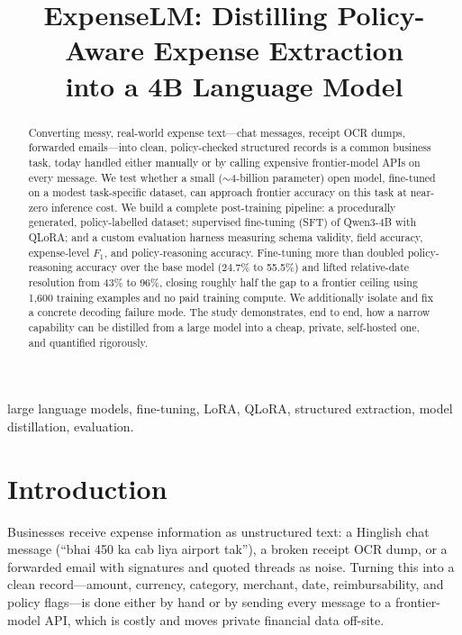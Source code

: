 \documentclass[conference]{IEEEtran}
\begin{document}
\title{ExpenseLM: Distilling Policy-Aware Expense Extraction\\into a 4B Language Model}

\author{
}

\maketitle

\begin{abstract}
Converting messy, real-world expense text---chat messages, receipt OCR dumps,
forwarded emails---into clean, policy-checked structured records is a common
business task, today handled either manually or by calling expensive
frontier-model APIs on every message. We test whether a small ($\sim$4-billion
parameter) open model, fine-tuned on a modest task-specific dataset, can
approach frontier accuracy on this task at near-zero inference cost. We build
a complete post-training pipeline: a procedurally generated, policy-labelled
dataset; supervised fine-tuning (SFT) of Qwen3-4B with QLoRA; and a custom
evaluation harness measuring schema validity, field accuracy, expense-level
$F_1$, and policy-reasoning accuracy. Fine-tuning more than doubled
policy-reasoning accuracy over the base model (24.7\% to 55.5\%) and lifted
relative-date resolution from 43\% to 96\%, closing roughly half the gap to a
frontier ceiling using 1{,}600 training examples and no paid training compute.
We additionally isolate and fix a concrete decoding failure mode. The study
demonstrates, end to end, how a narrow capability can be distilled from a large
model into a cheap, private, self-hosted one, and quantified rigorously.
\end{abstract}

\begin{IEEEkeywords}
large language models, fine-tuning, LoRA, QLoRA, structured extraction,
model distillation, evaluation.
\end{IEEEkeywords}

\section{Introduction}
Businesses receive expense information as unstructured text: a Hinglish chat
message (``bhai 450 ka cab liya airport tak''), a broken receipt OCR dump, or a
forwarded email with signatures and quoted threads as noise. Turning this into a
clean record---amount, currency, category, merchant, date, reimbursability, and
policy flags---is done either by hand or by sending every message to a
frontier-model API, which is costly and moves private financial data off-site.
\end{document}
